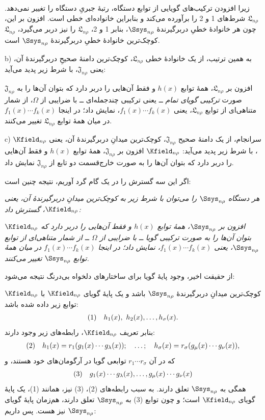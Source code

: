 \documentclass[11pt]{article}
\providecommand{\Lsys}{\mathfrak{L}}
\providecommand{\Jdom}{\mathfrak{J}}
\begin{document}
زیرا افزودن ترکیب‌های گویایی از توابع دستگاه، رتبهٔ جبریِ دستگاه را تغییر نمی‌دهد. $\Lsys_{n\rho}$ شرط‌های 1 و 2 را برآورده می‌کند و بنابراین خانواده‌ای خطی است. افزون بر این، چون هر خانوادهٔ خطیِ دربرگیرندهٔ $\Ssys_{n\rho}$، بنابر 1 و 2، $\Lsys_{n\rho}$ را نیز دربر می‌گیرد، $\Lsys_{n\rho}$ کوچک‌ترین خانوادهٔ خطیِ دربرگیرندهٔ $\Ssys_{n\rho}$ است.

b) به همین ترتیب، از یک خانوادهٔ خطی $\Lsys_{n\rho}$، کوچک‌ترین دامنهٔ صحیحِ دربرگیرندهٔ آن، یعنی $\Jdom_{n\rho}$، با شرط زیر پدید می‌آید:

$\Jdom_{n\rho}$ افزون بر $\Lsys_{n\rho}$، همهٔ توابع $h(x)$ و فقط آن‌هایی را دربر دارد که بتوان آن‌ها را به صورت \emph{ترکیبی گویای تمام} ــ یعنی ترکیبی چندجمله‌ای ــ با ضرایبی از $\Omega$، از شمار متناهی‌ای از توابع $\Lsys_{n\rho}$، یعنی $f_1(x)\cdots f_k(x)$، نمایش داد؛ در اینجا $f_1(x)\cdots f_k(x)$ در میان همهٔ توابع $\Lsys_{n\rho}$ تغییر می‌کنند.

c) سرانجام، از یک دامنهٔ صحیح $\Jdom_{n\rho}$، کوچک‌ترین میدانِ دربرگیرندهٔ آن، یعنی $\Kfield_{n\rho}$، با شرط زیر پدید می‌آید: $\Kfield_{n\rho}$ افزون بر $\Jdom_{n\rho}$، همهٔ توابع $h(x)$ و فقط آن‌هایی را دربر دارد که بتوان آن‌ها را به صورت خارج‌قسمت دو تابع از $\Jdom_{n\rho}$ نمایش داد.

اگر این سه گسترش را در یک گام گرد آوریم، نتیجه چنین است:

\emph{هر دستگاه $\Ssys_{n\rho}$ را می‌توان با شرط زیر به کوچک‌ترین میدانِ دربرگیرندهٔ آن، یعنی $\Kfield_{n\rho}$، گسترش داد:}

\emph{$\Kfield_{n\rho}$ افزون بر $\Ssys_{n\rho}$، همهٔ توابع $h(x)$ و فقط آن‌هایی را دربر دارد که بتوان آن‌ها را به صورت ترکیبی گویا ــ با ضرایبی از $\Omega$ ــ از شمار متناهی‌ای از توابع $\Ssys_{n\rho}$، یعنی $f_1(x)\cdots f_k(x)$، نمایش داد؛ در اینجا $f_1(x)\cdots f_k(x)$ در میان همهٔ توابع $\Ssys_{n\rho}$ تغییر می‌کنند.}

از حقیقت اخیر، وجود پایهٔ گویا برای ساختارهای دلخواه بی‌درنگ نتیجه می‌شود:

$\Kfield_{n\rho}$ کوچک‌ترین میدانِ دربرگیرندهٔ $\Ssys_{n\rho}$ باشد و یک پایهٔ گویای $\Kfield_{n\rho}$ با توابع زیر داده شده باشد:
\[
\begin{array}{@{}l@{\quad}c@{}}
(1)&h_1(x),\ h_2(x),\ldots,h_\sigma(x).
\end{array}
\]
بنابر تعریف $\Kfield_{n\rho}$، رابطه‌های زیر وجود دارند:
\[
\begin{array}{@{}l@{\quad}c@{}}
(2)&h_1(x)=r_1(g_1(x)\cdots g_\lambda(x));\quad\ldots;\quad h_\sigma(x)=r_\sigma(g_\mu(x)\cdots g_\nu(x)),
\end{array}
\]
که در آن $r_1\cdots r_\sigma$ توابعی گویا در آرگومان‌های خود هستند، و
\[
\begin{array}{@{}l@{\quad}c@{}}
(3)&g_1(x)\cdots g_\lambda(x),\ldots,g_\mu(x)\cdots g_\nu(x)
\end{array}
\]
همگی به $\Ssys_{n\rho}$ تعلق دارند. به سبب رابطه‌های (2)، (3) نیز، همانند (1)، یک پایهٔ گویای $\Kfield_{n\rho}$ است؛ و چون توابع (3) به $\Ssys_{n\rho}$ تعلق دارند، هم‌زمان پایهٔ گویای $\Ssys_{n\rho}$ نیز هست. پس داریم:
\end{document}

